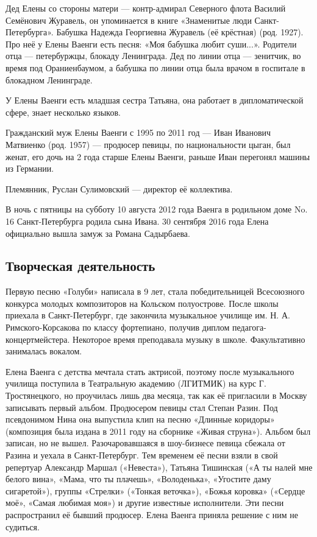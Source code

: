 Дед Елены со стороны матери --- контр-адмирал Северного флота Василий Семёнович Журавель, он упоминается в книге «Знаменитые люди Санкт-Петербурга». Бабушка Надежда Георгиевна Журавель (её крёстная) (род. 1927). Про неё у Елены Ваенги есть песня: «Моя бабушка любит суши...». Родители отца ---  петербуржцы,  блокаду Ленинграда. Дед по линии отца --- зенитчик, во время   под Ораниенбаумом, а бабушка по линии отца была врачом в госпитале в блокадном Ленинграде.

У Елены Ваенги есть младшая сестра Татьяна, она работает в дипломатической сфере, знает несколько языков.

Гражданский муж Елены Ваенги  с 1995 по 2011 год --- Иван Иванович Матвиенко (род. 1957) --- продюсер певицы, по национальности цыган, был женат, его дочь на 2 года старше Елены Ваенги, раньше Иван перегонял машины из Германии.

Племянник, Руслан Сулимовский --- директор её коллектива.

В ночь с пятницы на субботу 10 августа 2012 года Ваенга в родильном доме No. 16 Санкт-Петербурга родила сына Ивана. 30 сентября 2016 года Елена официально вышла замуж за Романа Садырбаева.

\subsection{Творческая деятельность}
Первую песню «Голуби» написала в 9 лет, стала победительницей Всесоюзного конкурса молодых композиторов на Кольском полуострове. После школы приехала в Санкт-Петербург, где закончила музыкальное училище им. Н. А. Римского-Корсакова по классу фортепиано, получив диплом педагога-концертмейстера. Некоторое время преподавала музыку в школе. Факультативно занималась вокалом.

Елена Ваенга с детства мечтала стать актрисой, поэтому после музыкального училища поступила в Театральную академию (ЛГИТМИК) на курс Г. Тростянецкого, но проучилась лишь два месяца, так как её пригласили в Москву записывать первый альбом. Продюсером певицы стал Степан Разин. Под псевдонимом Нина она выпустила клип на песню «Длинные коридоры» (композиция была издана в 2011 году на сборнике «Живая струна»). Альбом был записан, но не вышел. Разочаровавшаяся в шоу-бизнесе певица сбежала от Разина и уехала в Санкт-Петербург. Тем временем её песни взяли в свой репертуар Александр Маршал («Невеста»), Татьяна Тишинская («А ты налей мне белого вина», «Мама, что ты плачешь», «Володенька», «Угостите даму сигаретой»), группы «Стрелки» («Тонкая веточка»), «Божья коровка» («Сердце моё», «Самая любимая моя») и другие известные исполнители. Эти песни распространил её бывший продюсер. Елена Ваенга приняла решение с ним не судиться.

